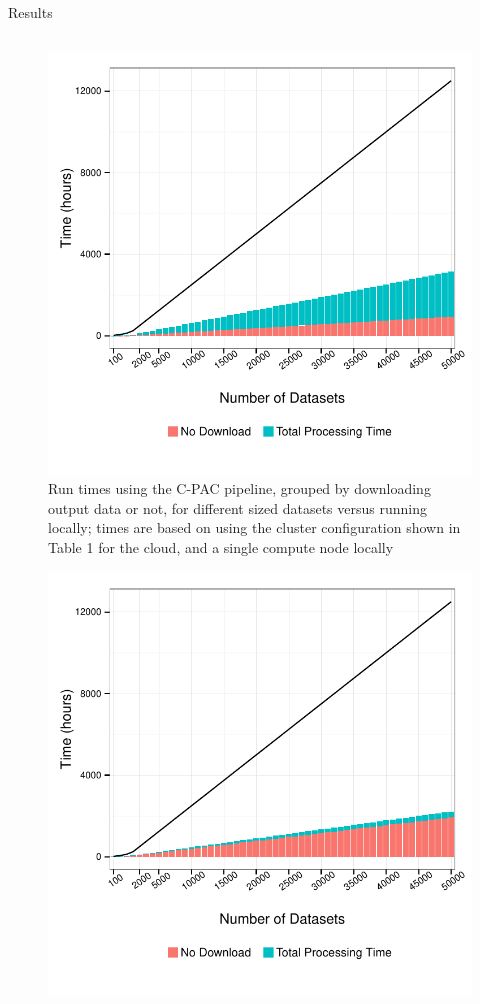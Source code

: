 \documentclass[final,hyperref={pdfpagelabels=false}]{beamer}
\begin{document}
\begin{frame}
\begin{columns}
\begin{column}{.5\textwidth}
\begin{block}{Results}
\begin{column}{.47\textwidth}
\begin{figure}
                    \includegraphics[width=.99\textwidth]{cpac-times.pdf}
                    \caption{\label{fig:cpac-times}Run times using the C-PAC pipeline, grouped by downloading output data or not, for different sized datasets versus running locally; times are based on using the cluster configuration shown in Table 1 for the cloud, and a single compute node locally}
                \end{figure}
                \begin{figure}
                    \includegraphics[width=.99\textwidth]{fs-times.pdf}

\end{figure}
\end{column}
\end{block}
\end{column}
\end{columns}
\end{frame}
\end{document}

